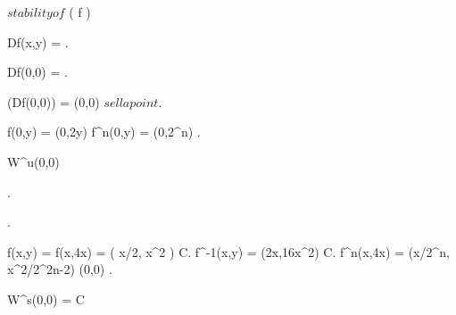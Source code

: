 \documentclass[../Main/main]{subfiles}
\begin{document}
{	
	{
		{
		}
		\study
		{
			$stability of $ \fixed( f )
		}
		\start
		{
			Df(x,y) = .

			Df(0,0) = .

			\sigma(Df(0,0)) =  \imp (0,0) $ sella point $.

			{
				f(0,y) = (0,2y) \imp f^n(0,y) = (0,2^n) \convergesto \infty.

				 \subset W^u(0,0)
			}.

			.

			{
				f(x,y) = f(x,4x) = ( x/2, x^2 ) \in C.
				f^{-1}(x,y) = (2x,16x^2) \in C.
				f^n(x,4x) = (x/2^n, x^2/2^{2n-2}) \convergesto (0,0)
			}.

			W^s(0,0) = C
		}	
	}
	
	
	
	
	
	
	
}
\end{document}
